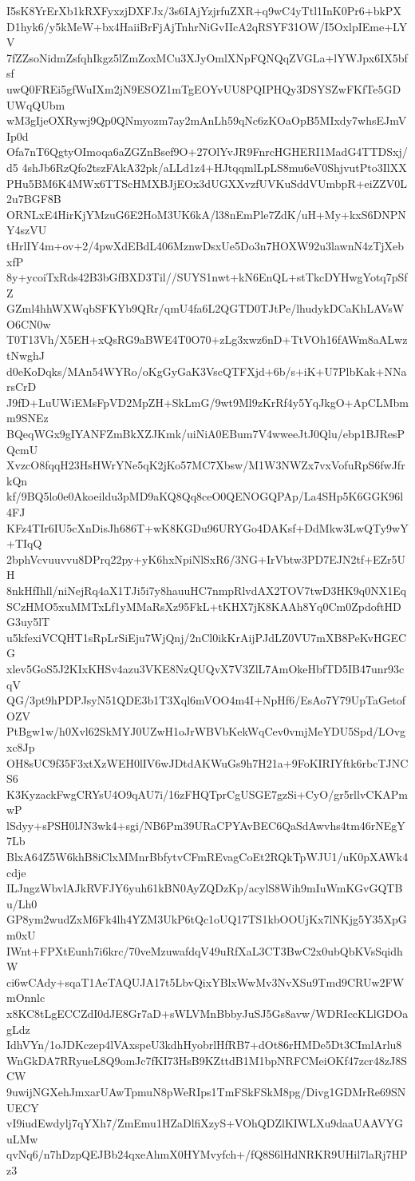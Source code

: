 I5sK8YrErXb1kRXFyxzjDXFJx/3s6IAjYzjrfuZXR+q9wC4yTtl1InK0Pr6+bkPX
D1hyk6/y5kMeW+bx4HaiiBrFjAjTnhrNiGvIIcA2qRSYF31OW/I5OxlpIEme+LYV
7fZZsoNidmZsfqhIkgz5lZmZoxMCu3XJyOmlXNpFQNQqZVGLa+lYWJpx6IX5bfsf
uwQ0FREi5gfWuIXm2jN9ESOZ1mTgEOYvUU8PQIPHQy3DSYSZwFKfTe5GDUWqQUbm
wM3gIjeOXRywj9Qp0QNmyozm7ay2mAnLh59qNc6zKOaOpB5MIxdy7whsEJmVIp0d
Ofa7nT6QgtyOImoqa6aZGZnBsef9O+27OlYvJR9FnrcHGHERI1MadG4TTDSxj/d5
4shJb6RzQfo2tszFAkA32pk/aLLd1z4+HJtqqmlLpLS8mu6eV0ShjvutPto3IlXX
PHu5BM6K4MWx6TTScHMXBJjEOx3dUGXXvzfUVKuSddVUmbpR+eiZZV0L2u7BGF8B
ORNLxE4HirKjYMzuG6E2HoM3UK6kA/l38nEmPle7ZdK/uH+My+kxS6DNPNY4szVU
tHrlIY4m+ov+2/4pwXdEBdL406MznwDsxUe5Do3n7HOXW92u3lawnN4zTjXebxfP
8y+ycoiTxRds42B3bGfBXD3Til//SUYS1nwt+kN6EnQL+stTkcDYHwgYotq7pSfZ
GZml4hhWXWqbSFKYb9QRr/qmU4fa6L2QGTD0TJtPe/lhudykDCaKhLAVsWO6CN0w
T0T13Vh/X5EH+xQsRG9aBWE4T0O70+zLg3xwz6nD+TtVOh16fAWm8aALwztNwghJ
d0eKoDqks/MAn54WYRo/oKgGyGaK3VscQTFXjd+6b/s+iK+U7PlbKak+NNarsCrD
J9fD+LuUWiEMsFpVD2MpZH+SkLmG/9wt9Ml9zKrRf4y5YqJkgO+ApCLMbmm9SNEz
BQeqWGx9gIYANFZmBkXZJKmk/uiNiA0EBum7V4wweeJtJ0Qlu/ebp1BJResPQcmU
XvzcO8fqqH23HsHWrYNe5qK2jKo57MC7Xbsw/M1W3NWZx7vxVofuRpS6fwJfrkQn
kf/9BQ5lo0e0Akoeildu3pMD9aKQ8Qq8ceO0QENOGQPAp/La4SHp5K6GGK96l4FJ
KFz4TIr6IU5cXnDisJh686T+wK8KGDu96URYGo4DAKsf+DdMkw3LwQTy9wY+TIqQ
2bphVcvuuvvu8DPrq22py+yK6hxNpiNlSxR6/3NG+IrVbtw3PD7EJN2tf+EZr5UH
8nkHfIhll/niNejRq4aX1TJi5i7y8hauuHC7nmpRlvdAX2TOV7twD3HK9q0NX1Eq
SCzHMO5xuMMTxLf1yMMaRsXz95FkL+tKHX7jK8KAAh8Yq0Cm0ZpdoftHDG3uy5lT
u5kfexiVCQHT1sRpLrSiEju7WjQnj/2nCl0ikKrAijPJdLZ0VU7mXB8PeKvHGECG
xlev5GoS5J2KIxKHSv4azu3VKE8NzQUQvX7V3ZlL7AmOkeHbfTD5IB47unr93cqV
QG/3pt9hPDPJsyN51QDE3b1T3Xql6mVOO4m4I+NpHf6/EsAo7Y79UpTaGetofOZV
PtBgw1w/h0Xvl62SkMYJ0UZwH1oJrWBVbKekWqCev0vmjMeYDU5Spd/LOvgxc8Jp
OH8sUC9f35F3xtXzWEH0lIV6wJDtdAKWuGs9h7H21a+9FoKIRIYftk6rbcTJNCS6
K3KyzackFwgCRYsU4O9qAU7i/16zFHQTprCgUSGE7gzSi+CyO/gr5rllvCKAPmwP
lSdyy+sPSH0lJN3wk4+sgi/NB6Pm39URaCPYAvBEC6QaSdAwvhs4tm46rNEgY7Lb
BlxA64Z5W6khB8iClxMMnrBbfytvCFmREvagCoEt2RQkTpWJU1/uK0pXAWk4cdje
ILJngzWbvlAJkRVFJY6yuh61kBN0AyZQDzKp/acylS8Wih9mIuWmKGvGQTBu/Lh0
GP8ym2wudZxM6Fk4lh4YZM3UkP6tQc1oUQ17TS1kbOOUjKx7lNKjg5Y35XpGm0xU
IWnt+FPXtEunh7i6krc/70veMzuwafdqV49uRfXaL3CT3BwC2x0ubQbKVsSqidhW
ci6wCAdy+sqaT1AeTAQUJA17t5LbvQixYBlxWwMv3NvXSu9Tmd9CRUw2FWmOnnlc
x8KC8tLgECCZdI0dJE8Gr7aD+sWLVMnBbbyJuSJ5Gs8avw/WDRIccKLlGDOagLdz
IdhVYn/1oJDKczep4lVAxspeU3kdhHyobrlHfRB7+dOt86rHMDe5Dt3CImlArlu8
WnGkDA7RRyueL8Q9omJc7fKI73HsB9KZttdB1M1bpNRFCMeiOKf47zcr48zJ8SCW
9uwijNGXehJmxarUAwTpmuN8pWeRIps1TmFSkFSkM8pg/Divg1GDMrRe69SNUECY
vI9iudEwdylj7qYXh7/ZmEmu1HZaDlfiXzyS+VOhQDZlKIWLXu9daaUAAVYGuLMw
qvNq6/n7hDzpQEJBb24qxeAhmX0HYMvyfch+/fQ8S6lHdNRKR9UHil7laRj7HPz3
